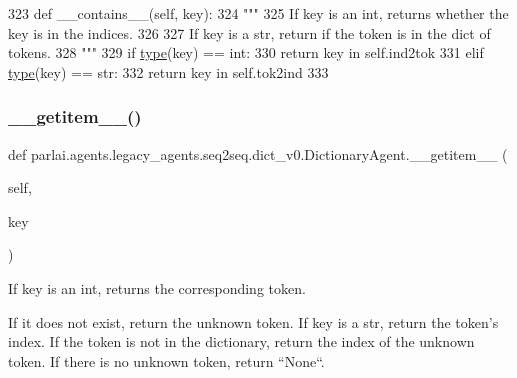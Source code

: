 \begin{DoxyCode}
323     \textcolor{keyword}{def }\_\_contains\_\_(self, key):
324         \textcolor{stringliteral}{"""}
325 \textcolor{stringliteral}{        If key is an int, returns whether the key is in the indices.}
326 \textcolor{stringliteral}{}
327 \textcolor{stringliteral}{        If key is a str, return if the token is in the dict of tokens.}
328 \textcolor{stringliteral}{        """}
329         \textcolor{keywordflow}{if} \hyperlink{namespaceparlai_1_1agents_1_1tfidf__retriever_1_1build__tfidf_ad5dfae268e23f506da084a9efb72f619}{type}(key) == int:
330             \textcolor{keywordflow}{return} key \textcolor{keywordflow}{in} self.ind2tok
331         \textcolor{keywordflow}{elif} \hyperlink{namespaceparlai_1_1agents_1_1tfidf__retriever_1_1build__tfidf_ad5dfae268e23f506da084a9efb72f619}{type}(key) == str:
332             \textcolor{keywordflow}{return} key \textcolor{keywordflow}{in} self.tok2ind
333 
\end{DoxyCode}
\mbox{\label{classparlai_1_1agents_1_1legacy__agents_1_1seq2seq_1_1dict__v0_1_1DictionaryAgent_a09fc8bfa07769eaa59f5d7b7fef95b72}} 
\subsubsection{\texorpdfstring{\+\_\+\+\_\+getitem\+\_\+\+\_\+()}{\_\_getitem\_\_()}}
{\footnotesize\ttfamily def parlai.\+agents.\+legacy\+\_\+agents.\+seq2seq.\+dict\+\_\+v0.\+Dictionary\+Agent.\+\_\+\+\_\+getitem\+\_\+\+\_\+ (\begin{DoxyParamCaption}\item[{}]{self,  }\item[{}]{key }\end{DoxyParamCaption})}

\begin{DoxyVerb}If key is an int, returns the corresponding token.

If it does not exist, return the unknown token. If key is a str, return the
token's index. If the token is not in the dictionary, return the index of the
unknown token. If there is no unknown token, return ``None``.
\end{DoxyVerb}
 

